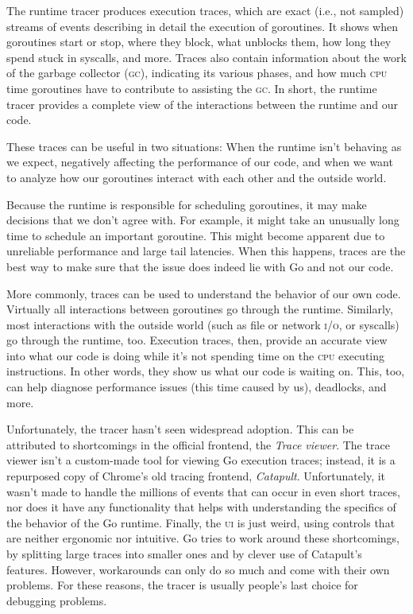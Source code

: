 \documentclass[10pt,letterpaper,oneside,openany,english]{memoir}
\begin{document}
The runtime tracer produces execution traces, which are exact (i.e., not sampled) streams of events describing in detail the execution of goroutines.
It shows when goroutines start or stop, where they block, what unblocks them, how long they spend stuck in syscalls, and more.
Traces also contain information about the work of the garbage collector (\textsc{gc}), indicating its various phases, and how much \textsc{cpu} time goroutines have to contribute to assisting the \textsc{gc}.
In short, the runtime tracer provides a complete view of the interactions between the runtime and our code.

These traces can be useful in two situations:
When the runtime isn't behaving as we expect, negatively affecting the performance of our code,
and when we want to analyze how our goroutines interact with each other and the outside world.

Because the runtime is responsible for scheduling goroutines, it may make decisions that we don't agree with.
For example, it might take an unusually long time to schedule an important goroutine.
This might become apparent due to unreliable performance and large tail latencies.
When this happens, traces are the best way to make sure that the issue does indeed lie with Go and not our code.

More commonly, traces can be used to understand the behavior of our own code.
Virtually all interactions between goroutines go through the runtime.
Similarly, most interactions with the outside world (such as file or network \textsc{i/o}, or syscalls) go through the runtime, too.
Execution traces, then, provide an accurate view into what our code is doing while it's not spending time on the \textsc{cpu} executing instructions.
In other words, they show us what our code is waiting on.
This, too, can help diagnose performance issues (this time caused by us), deadlocks, and more.

Unfortunately, the tracer hasn't seen widespread adoption.
This can be attributed to shortcomings in the official frontend, the \emph{Trace viewer}.
The trace viewer isn't a custom-made tool for viewing Go execution traces;
instead, it is a repurposed copy of Chrome's old tracing frontend, \emph{Catapult}.
Unfortunately, it wasn't made to handle the millions of events that can occur in even short traces,
nor does it have any functionality that helps with understanding the specifics of the behavior of the Go runtime.
Finally, the \textsc{ui} is just weird, using controls that are neither ergonomic nor intuitive.
Go tries to work around these shortcomings, by splitting large traces into smaller ones and by clever use of Catapult's features.
However, workarounds can only do so much and come with their own problems.
For these reasons, the tracer is usually people's last choice for debugging problems.
\end{document}

